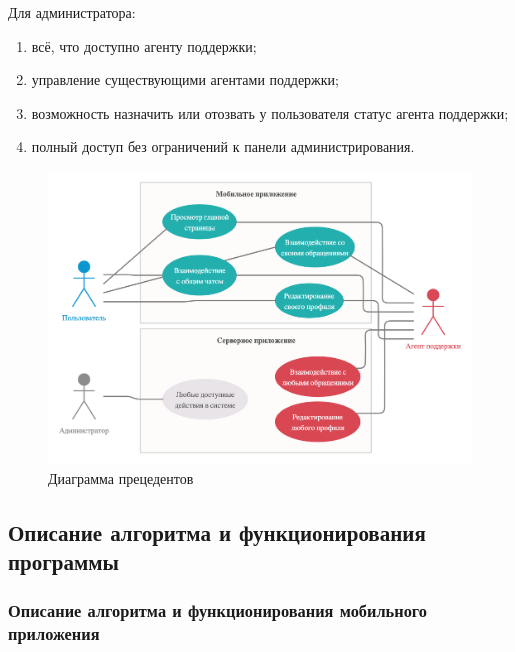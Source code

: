 \documentclass{../includes/TechDoc}
\begin{document}
    Для администратора:
    \begin{enumerate}[noitemsep]
        \item всё, что доступно агенту поддержки;
        \item управление существующими агентами поддержки;
        \item возможность назначить или отозвать у пользователя статус агента поддержки;
        \item полный доступ без ограничений к панели администрирования.
    \end{enumerate}

    \begin{figure}[h]
        \centering
        \includegraphics[width=0.8\linewidth]{images/uml_pr.png}
        \caption{Диаграмма прецедентов}
        \label{fig:uml_pr}
    \end{figure}

    \newpage

    \subsection{Описание алгоритма и функционирования программы}

    \subsubsection{Описание алгоритма и функционирования мобильного приложения}
\end{document}
